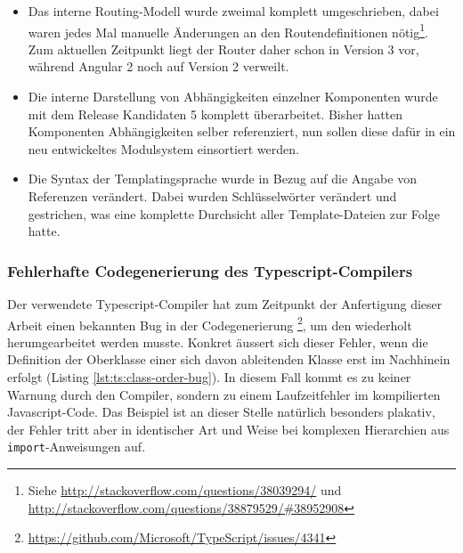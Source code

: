 \begin{itemize}[noitemsep]
\item Das interne Routing-Modell wurde zweimal komplett umgeschrieben, dabei waren jedes Mal manuelle Änderungen an den Routendefinitionen nötig\footnote{Siehe \url{http://stackoverflow.com/questions/38039294/} und \\ \url{http://stackoverflow.com/questions/38879529/#38952908}}. Zum aktuellen Zeitpunkt liegt der Router daher schon in Version 3 vor, während Angular 2 noch auf Version 2 verweilt.
\item Die interne Darstellung von Abhängigkeiten einzelner Komponenten wurde mit dem Release Kandidaten 5 komplett überarbeitet. Bisher hatten Komponenten Abhängigkeiten selber referenziert, nun sollen diese dafür in ein neu entwickeltes Modulsystem einsortiert werden.
\item Die Syntax der Templatingsprache wurde in Bezug auf die Angabe von Referenzen verändert. Dabei wurden Schlüsselwörter verändert und gestrichen, was eine komplette Durchsicht aller Template-Dateien zur Folge hatte.
\end{itemize}

\subsubsection{Fehlerhafte Codegenerierung des Typescript-Compilers}

Der verwendete Typescript-Compiler hat zum Zeitpunkt der Anfertigung dieser Arbeit einen bekannten Bug in der Codegenerierung \footnote{\url{https://github.com/Microsoft/TypeScript/issues/4341}}, um den wiederholt herumgearbeitet werden musste. Konkret äussert sich dieser Fehler, wenn die Definition der Oberklasse einer sich davon ableitenden Klasse erst im Nachhinein erfolgt (Listing \ref{lst:ts:class-order-bug}). In diesem Fall kommt es zu keiner Warnung durch den Compiler, sondern zu einem Laufzeitfehler im kompilierten Javascript-Code. Das Beispiel ist an dieser Stelle natürlich besonders plakativ, der Fehler tritt aber in identischer Art und Weise bei komplexen Hierarchien aus \texttt{import}-Anweisungen auf.



